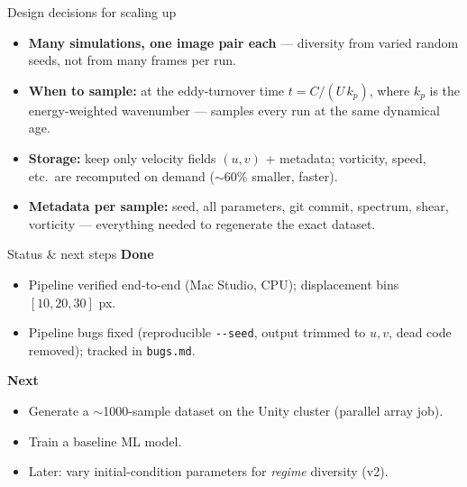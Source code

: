 \documentclass[aspectratio=169]{beamer}
\begin{document}
\begin{frame}{Design decisions for scaling up}
\begin{itemize}\setlength\itemsep{0.45em}
  \item \textbf{Many simulations, one image pair each} --- diversity from varied random
        seeds, not from many frames per run.
  \item \textbf{When to sample:} at the eddy-turnover time $t = C/(U\,k_p)$, where $k_p$ is
        the energy-weighted wavenumber --- samples every run at the same dynamical age.
  \item \textbf{Storage:} keep only velocity fields $(u,v)$ + metadata; vorticity, speed,
        etc.\ are recomputed on demand ($\sim$60\% smaller, faster).
  \item \textbf{Metadata per sample:} seed, all parameters, git commit, spectrum, shear,
        vorticity --- everything needed to regenerate the exact dataset.
\end{itemize}
\end{frame}

\begin{frame}{Status \& next steps}
\textbf{Done}
\begin{itemize}\setlength\itemsep{0.2em}
  \item Pipeline verified end-to-end (Mac Studio, CPU); displacement bins $[10,20,30]$ px.
  \item Pipeline bugs fixed (reproducible \texttt{-{}-seed}, output trimmed to $u,v$, dead
        code removed); tracked in \texttt{bugs.md}.
\end{itemize}

\vspace{0.6em}
\textbf{Next}
\begin{itemize}\setlength\itemsep{0.2em}
  \item Generate a $\sim$1000-sample dataset on the Unity cluster (parallel array job).
  \item Train a baseline ML model.
  \item Later: vary initial-condition parameters for \emph{regime} diversity (v2).
\end{itemize}
\end{frame}
\end{document}
